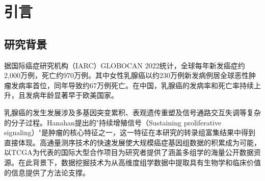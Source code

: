 \documentclass[12pt,a4paper,openany]{ctexbook}
\begin{document}


\frontmatter
{}
\begin{abstract}
\noindent 乳腺癌是全球发病率最高的恶性肿瘤，其分子异质性是精准诊疗面临的核心挑战。本研究基于TCGA-BRCA多组学数据（mRNA转录组25,981个基因、miRNA表达谱1,881个、体细胞突变15,413个基因及临床注释94项），对1,076例多组学共同患者进行了系统性的数据挖掘分析。研究综合运用DESeq2差异表达分析、LASSO和随机森林分类、PCA/t-SNE聚类、WGCNA共表达网络、Cox比例风险回归、maftools突变景观分析、g:Profiler功能富集分析、arules关联规则挖掘及ConsensusClusterPlus共识聚类等算法。主要结果包括：鉴定6,768个显著差异表达基因（$|\log_2\text{FC}|>1$, FDR$<0.05$），其中上调4,334个、下调2,434个；LASSO分类器以89.4\%准确率实现三分类分子亚型预测，仅使用35个基因；WGCNA识别8个有效共表达模块（另含grey未分配基因集），blue模块枢纽基因模块隶属度达0.959；多变量Cox模型C-index为0.771，Stage IV风险比达30.36（95\%CI: 9.87--93.45）；PIK3CA（37.3\%）和TP53（35.2\%）为最高频突变基因；功能富集揭示上调基因显著富集于细胞周期通路（Reactome Cell Cycle, 187个基因, $p=1.5\times10^{-21}$）。本研究为乳腺癌多组学数据挖掘提供了完整分析框架。

\vspace{1em}
\vspace{1em}：乳腺癌；TCGA；多组学数据挖掘；差异表达分析；WGCNA；预后模型
\end{abstract}

\newpage
\tableofcontents
\newpage
\listoffigures
\newpage
\listoftables
\newpage
\mainmatter
{}
\setcounter{page}{1}
\chapter{引言}

\section{研究背景}
据国际癌症研究机构（IARC）GLOBOCAN 2022统计，全球每年新发癌症约2,000万例，死亡约970万例\cite{sung2024global}。其中女性乳腺癌以约230万例新发病例居全球恶性肿瘤发病率首位，同年导致约67万例死亡。在中国，乳腺癌的发病率和死亡率持续上升，且发病年龄显著早于欧美国家。

乳腺癌的发生发展涉及多基因突变累积、表观遗传重塑及信号通路交互失调等复杂的分子过程\cite{hanahan2011hallmarks}。Hanahan提出的"持续增殖信号（Sustaining proliferative signaling）"是肿瘤的核心特征之一\cite{hanahan2011hallmarks}，这一特征在本研究的转录组富集结果中得到直接体现。高通量测序技术的快速发展使大规模癌症基因组数据的积累成为可能，以TCGA\cite{tcga2012comprehensive}为代表的国际大型合作项目为研究者提供了涵盖多组学的海量公开数据资源。在此背景下，数据挖掘技术为从高维度组学数据中提取具有生物学和临床价值的信息提供了方法论支撑。
\end{document}
